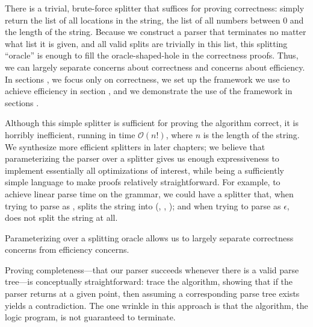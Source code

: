   There is a trivial, brute-force splitter that suffices for proving correctness: simply return the list of all locations in the string, the list of all numbers between 0 and the length of the string.  Because we construct a parser that terminates no matter what list it is given, and all valid splits are trivially in this list, this splitting ``oracle'' is enough to fill the oracle-shaped-hole in the correctness proofs.  Thus, we can largely separate concerns about correctness and concerns about efficiency.  In sections , we focus only on correctness, we set up the framework we use to achieve efficiency in section , and we demonstrate the use of the framework in sections .

  Although this simple splitter is sufficient for proving the algorithm correct, it is horribly inefficient, running in time $\mathcal O(n!)$, where $n$ is the length of the string.  We synthesize more efficient splitters in later chapters; we believe that parameterizing the parser over a splitter gives us enough expressiveness to implement essentially all optimizations of interest, while being a sufficiently simple language to make proofs relatively straightforward.  For example, to achieve linear parse time on the  grammar, we could have a splitter that, when trying to parse  as , splits the string into (, , ); and when trying to parse  as $\epsilon$, does not split the string at all.
  
  Parameterizing over a splitting oracle allows us to largely separate correctness concerns from efficiency concerns.



  Proving completeness---that our parser succeeds whenever there is a valid parse tree---is conceptually straightforward: trace the algorithm, showing that if the parser returns \false\space at a given point, then assuming a corresponding parse tree exists yields a contradiction.  The one wrinkle in this approach is that the algorithm, the logic program, is not guaranteed to terminate.

